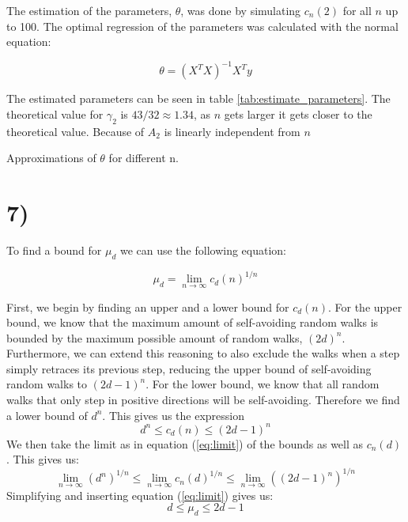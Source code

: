 \documentclass[a4paper]{article}
\begin{document}
The estimation of the parameters, $\theta$, was done by simulating $c_n(2)$ for all $n$ up to 100. The optimal regression of the parameters was calculated with the normal equation:

\begin{equation}
    \theta = (X^T X)^{-1}X^T y    
\end{equation}

The estimated parameters can be seen in table \ref{tab:estimate_parameters}. The theoretical value for $\gamma_2$ is $43/32 \approx 1.34$, as $n$ gets larger it gets closer to the theoretical value. Because of $A_2$ is linearly independent from $n$ 

\begin{table}[H]
    \centering
    \caption{Approximations of $\theta$ for different n.}
    \label{tab:estimate_parameters}
    
\end{table}
\section*{7)}

To find a bound for $\mu_d$ we can use the following equation:

\begin{equation}
    \label{eq:limit}
     \mu_d = \lim_{n \to \infty} c_d(n)^{1/n}
\end{equation}


First, we begin by finding an upper and a lower bound for $c_d(n)$. For the upper bound, we know that the maximum amount of self-avoiding random walks is bounded by the maximum possible amount of random walks, $(2d)^n$. Furthermore, we can extend this reasoning to also exclude the walks when a step simply retraces its previous step, reducing the upper bound of self-avoiding random walks to $(2d-1)^n$. For the lower bound, we know that all random walks that only step in positive directions will be self-avoiding. Therefore we find a lower bound of $d^n$. This gives us the expression \begin{equation}
    d^n \leq c_d(n) \leq (2d-1)^n
\end{equation}
We then take the limit as in equation (\ref{eq:limit}) of the bounds as well as $c_n(d)$. This gives us:
\begin{equation}
    \lim_{n \to \infty} (d^n)^{1/n} \leq \lim_{n \to \infty} c_n(d)^{1/n} \leq \lim_{n \to \infty} ((2d-1)^n)^{1/n}
\end{equation}
Simplifying and inserting equation (\ref{eq:limit}) gives us:
\begin{equation}
    d \leq \mu_d \leq 2d-1
\end{equation}
\end{document}
